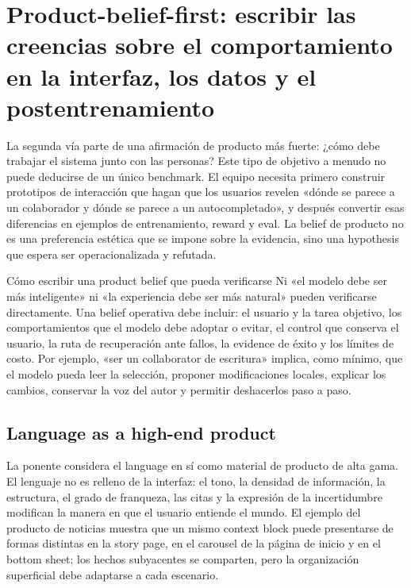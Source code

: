 \section{Product-belief-first: escribir las creencias sobre el comportamiento en la interfaz, los datos y el postentrenamiento}

La segunda vía parte de una afirmación de producto más fuerte: ¿cómo debe trabajar el sistema junto con las personas? Este tipo de objetivo a menudo no puede deducirse de un único benchmark. El equipo necesita primero construir prototipos de interacción que hagan que los usuarios revelen «dónde se parece a un colaborador y dónde se parece a un autocompletado», y después convertir esas diferencias en ejemplos de entrenamiento, reward y eval. La belief de producto no es una preferencia estética que se impone sobre la evidencia, sino una hypothesis que espera ser operacionalizada y refutada.


\begin{importantbox}{Cómo escribir una product belief que pueda verificarse}
Ni «el modelo debe ser más inteligente» ni «la experiencia debe ser más natural» pueden verificarse directamente. Una belief operativa debe incluir: el usuario y la tarea objetivo, los comportamientos que el modelo debe adoptar o evitar, el control que conserva el usuario, la ruta de recuperación ante fallos, la evidence de éxito y los límites de costo. Por ejemplo, «ser un collaborator de escritura» implica, como mínimo, que el modelo pueda leer la selección, proponer modificaciones locales, explicar los cambios, conservar la voz del autor y permitir deshacerlos paso a paso.
\end{importantbox}

\subsection{Language as a high-end product}

La ponente considera el language en sí como material de producto de alta gama. El lenguaje no es relleno de la interfaz: el tono, la densidad de información, la estructura, el grado de franqueza, las citas y la expresión de la incertidumbre modifican la manera en que el usuario entiende el mundo. El ejemplo del producto de noticias muestra que un mismo context block puede presentarse de formas distintas en la story page, en el carousel de la página de inicio y en el bottom sheet; los hechos subyacentes se comparten, pero la organización superficial debe adaptarse a cada escenario.

